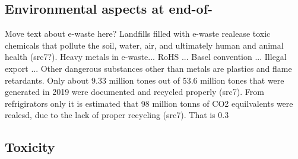 \subsection{Environmental aspects at end-of-}

Move text about e-waste here?
Landfills filled with e-waste realease toxic chemicals that pollute the soil, water, air, and ultimately human and animal health (src7?).
Heavy metals in e-waste...
RoHS ...
Basel convention ...
Illegal export ...
Other dangerous substances other than metals are plastics and flame retardants. 
Only about 9.33 million tones out of 53.6 million tones that were generated in 2019 were documented and recycled properly (src7). From refrigirators only it is estimated that 98 million tonns of CO2 equilvalents were realesd, due to the lack of proper recycling (src7). That is 0.3%

\subsection{Toxicity}
